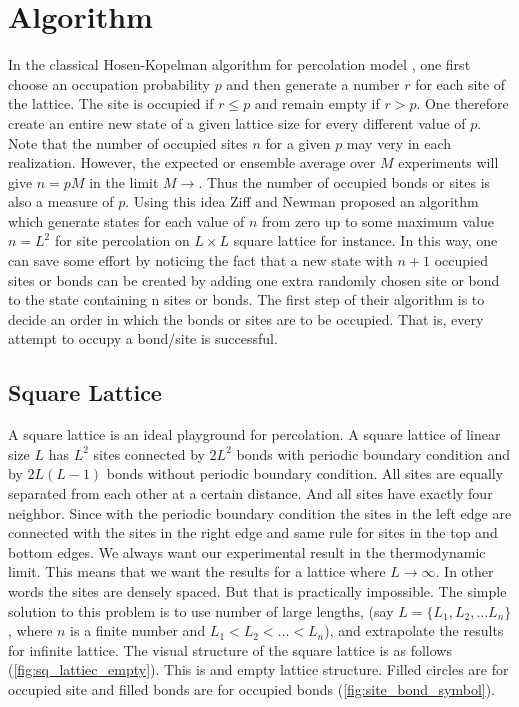 \section{Algorithm} \label{sect:algorithm}
	In the classical Hosen-Kopelman algorithm for percolation model \cite{Hoshen1976}, one first choose an occupation probability $p$ and then generate a number $r$ for each site of the lattice. The site is occupied if $r \leq p$ and remain empty if $r > p$. One therefore create an entire new state of a given lattice size for every different value of $p$. Note that the number of occupied sites $n$ for a given $p$ may very in each realization. However, the expected or ensemble average over $M$ experiments will give $n = p M$ in the limit $M \rightarrow$. Thus the number of occupied bonds or sites is also a measure of $p$. Using this idea Ziff and Newman \cite{Newman2001} proposed an algorithm which generate states for each value of $n$ from zero up to some maximum value $n = L^2$ for site percolation on $L\times L$ square lattice for instance. In this way, one can save some effort by noticing the fact that a new state with $n + 1$ occupied sites or bonds can be created by adding one extra randomly chosen site or bond to the state containing n sites or bonds. The first step of their algorithm is to decide an order in which the bonds or sites are to be occupied. That is, every attempt to occupy a bond/site is successful.
	
	\subsection{Square Lattice}
	A square lattice is an ideal playground for percolation. 	A square lattice of linear size $L$ has 
	$L^2$ sites connected by $2L^2$  bonds with periodic boundary condition and by
	$2L(L-1)$ bonds without periodic boundary condition. All sites are equally separated from each other at a certain distance. And all sites have exactly four neighbor. Since with the periodic boundary condition the sites in the left edge are connected with the sites in the right edge and same rule for sites in the top and bottom edges. We always want our experimental result in the thermodynamic limit. This means that we want the results for a lattice where $L\rightarrow \infty$. In other words the sites are densely spaced. But that is practically impossible. The simple solution to this problem is to use number of large lengths, (say $L = \{L_1, L_2, \ldots L_n \}$, where $n$ is a finite number and $L_1 < L_2 < \ldots < L_n$), and extrapolate the results for infinite lattice. The visual structure of the square lattice is as follows (\ref{fig:sq_lattiec_empty}). This is and empty lattice structure. Filled circles are for occupied site and filled bonds are for occupied bonds (\ref{fig:site_bond_symbol}).
	
